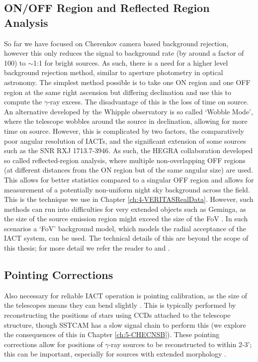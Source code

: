 \subsection{ON/OFF Region and Reflected Region Analysis}
So far we have focused on Cherenkov camera based background rejection, however this only reduces the signal to background rate (by around a factor of 100) to $\sim$1:1 for bright sources. As such, there is a need for a higher level background rejection method, similar to aperture photometry in optical astronomy. The simplest method possible is to take one ON region and one OFF region at the same right ascension but differing declination and use this to compute the $\gamma$-ray excess. The disadvantage of this is the loss of time on source. An alternative developed by the Whipple observatory is so called `Wobble Mode', where the telescope wobbles around the source in declination, allowing for more time on source. However, this is complicated by two factors, the comparatively poor angular resolution of IACTs, and the significant extension of some sources such as the SNR RXJ 1713.7-3946. As such, the HEGRA collaboration \cite{HEGRA} developed so called reflected-region analysis, where multiple non-overlapping OFF regions (at different distances from the ON region but of the same angular size) are used. This allows for better statistics compared to a singular OFF region and allows for measurement of a potentially non-uniform night sky background across the field. This is the technique we use in Chapter \ref{ch:4-VERITASRealData}. However, such methods can run into difficulties for very extended objects such as Geminga, as the size of the source emission region might exceed the size of the FoV \cite{geminga}. In such scenarios a `FoV' background model, which models the radial acceptance of the IACT system, can be used. The technical details of this are beyond the scope of this thesis; for more detail we refer the reader to \cite{Berge07} and \cite{geminga}. 

\subsection{Pointing Corrections}
Also necessary for reliable IACT operation is pointing calibration, as the size of the telescopes means they can bend slightly \cite{veritasstat}. This is typically performed by reconstructing the positions of stars using CCDs attached to the telescope structure, though SSTCAM has a slow signal chain to perform this (we explore the consequences of this in Chapter \ref{ch:5-CHECNSB}). These pointing corrections allow for positions of $\gamma$-ray sources to be reconstructed to within 2-3'; this can be important, especially for sources with extended morphology \cite{cena} \cite{rxjcta}.

